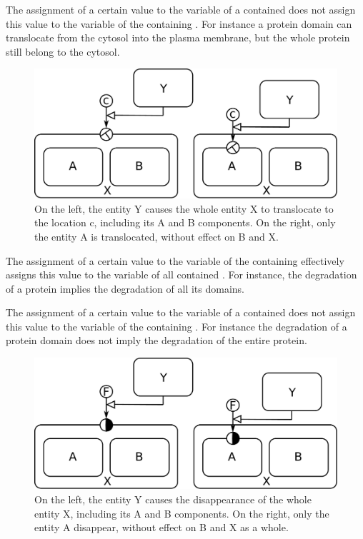 \noindent
The assignment of a certain value to the variable  of a contained  does not assign this value to the variable  of the containing . For instance a protein domain can translocate from the cytosol into the plasma membrane, but the whole protein still belong to the cytosol.

\begin{figure}[H]
  \centering
  \includegraphics[scale = 0.3]{images/nesting-location}
  \caption{On the left, the entity Y causes the whole entity X to translocate to the location c, including its A and B components. On the right, only the entity A is translocated, without effect on B and X.}
  \label{fig:nesting-location}
\end{figure}


\noindent
The assignment of a certain value to the variable  of the containing  effectively assigns this value to the variable  of all contained . For instance, the degradation of a protein implies the degradation of all its domains.

\noindent
The assignment of a certain value to the variable  of a contained  does not assign this value to the variable  of the containing . For instance the degradation of a protein domain does not imply the degradation of the entire protein.

\begin{figure}[H]
  \centering
  \includegraphics[scale = 0.3]{images/nesting-existence}
  \caption{On the left, the entity Y causes the disappearance of the whole entity X, including its A and B components. On the right, only the entity A disappear, without effect on B and X as a whole.}
  \label{fig:nesting-existence}
\end{figure}

